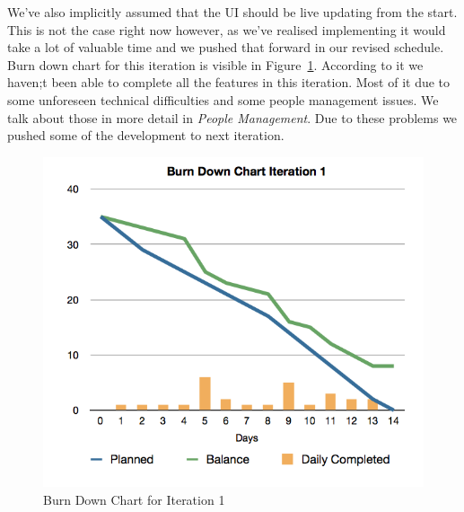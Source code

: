 \documentclass[a4paper,12pt]{article}
\begin{document}
	We've also implicitly assumed that the UI should be live updating from the start. This is not the case right now however, as we've realised implementing it would take a lot of valuable time and we pushed that forward in our revised schedule. Burn down chart for this iteration is visible in Figure~\ref{burndown1}. According to it we haven;t been able to complete all the features in this iteration. Most of it due to some unforeseen technical difficulties and some people management issues. We talk about those in more detail in \emph{People Management}. Due to these problems we pushed some of the development to next iteration.
	\begin{figure}
	  \begin{center}
	  \caption{\label{burndown1} Burn Down Chart for Iteration 1}
		\includegraphics[scale=0.4]{burndown1.png}
    \end{center}
	\end{figure}
	
\end{document}

